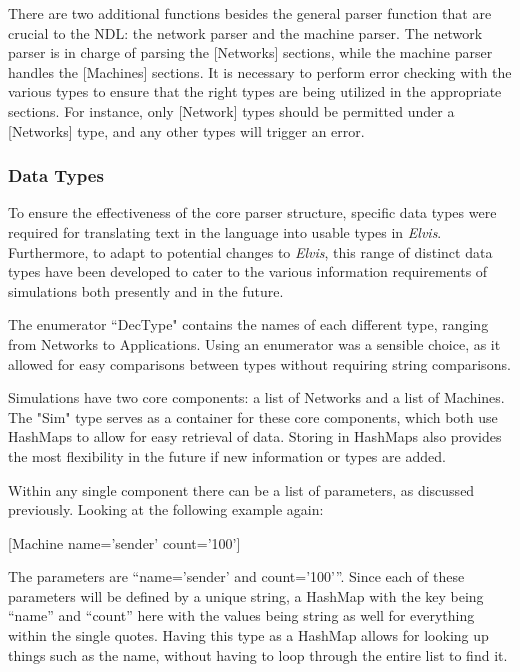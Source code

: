 \documentclass[journal]{IEEEtran} %
\newcommand{\elvis}{\textit{Elvis}}
\begin{document}
There are two additional functions besides the general parser function that are crucial to the NDL: the network parser and the machine parser. The network parser is in charge of parsing the [Networks] sections, while the machine parser handles the [Machines] sections. It is necessary to perform error checking with the various types to ensure that the right types are being utilized in the appropriate sections. For instance, only [Network] types should be permitted under a [Networks] type, and any other types will trigger an error.

\subsubsection{Data Types}
To ensure the effectiveness of the core parser structure, specific data types were required for translating text in the language into usable types in \elvis{}. Furthermore, to adapt to potential changes to \elvis{}, this range of distinct data types have been developed to cater to the various information requirements of simulations both presently and in the future.

The enumerator “DecType" contains the names of each different type, ranging from Networks to Applications. Using an enumerator was a sensible choice, as it allowed for easy comparisons between types without requiring string comparisons.

Simulations have two core components: a list of Networks and a list of Machines. The "Sim" type serves as a container for these core components, which both use HashMaps to allow for easy retrieval of data. Storing in HashMaps also provides the most flexibility in the future if new information or types are added.

Within any single component there can be a list of parameters, as discussed previously. Looking at the following example again: 

[Machine name='sender' count=’100']

The parameters are “name='sender' and count=’100'”. Since each of these parameters will be defined by a unique string, a HashMap with the key being “name” and “count” here with the values being string as well for everything within the single quotes. Having this type as a HashMap allows for looking up things such as the name, without having to loop through the entire list to find it.
\end{document}

